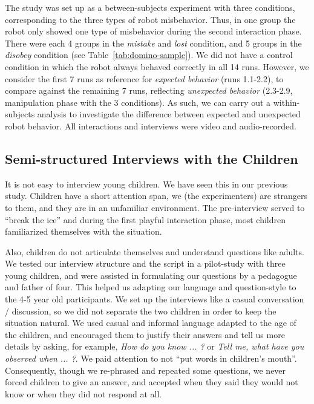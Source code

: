 \documentclass{sig-alternate}
\begin{document}

The study was set up as a between-subjects experiment with three conditions,
corresponding to the three types of robot misbehavior. Thus, in one group the
robot only showed one type of misbehavior during the second interaction phase.
There were each 4 groups in the \textit{mistake} and \textit{lost} condition,
and 5 groups in the \textit{disobey} condition (see
Table~\ref{tab:domino-sample}). We did not have a control condition in which the
robot always behaved correctly in all 14 runs. However, we consider the first 7
runs as reference for \textit{expected behavior} (runs 1.1-2.2), to compare
against the remaining 7 runs, reflecting \textit{unexpected behavior} (2.3-2.9,
manipulation phase with the 3 conditions). As such, we can carry out a
within-subjects analysis to investigate the difference between expected and
unexpected robot behavior. All interactions and interviews were video and
audio-recorded.

\subsection{Semi-structured Interviews with the Children}	

It is not easy to interview young children. We have seen this in our previous
study. Children have a short attention span, we (the experimenters) are
strangers to them, and they are in an unfamiliar environment. The pre-interview
served to ``break the ice'' and during the first playful interaction phase, most
children familiarized themselves with the situation.

Also, children do not articulate themselves and understand questions like
adults. We tested our interview structure and the script in a pilot-study with
three young children, and were assisted in formulating our questions by a
pedagogue and father of four. This helped us adapting our language and
question-style to the 4-5 year old participants. We set up the interviews like a
casual conversation / discussion, so we did not separate the two children in
order to keep the situation natural. We used casual and informal language
adapted to the age of the children, and encouraged them to justify their answers
and tell us more details by asking, for example, \textit{How do you know ... ?}
or \textit{Tell me, what have you observed when ... ?}. We paid attention to not
``put words in children's mouth''. Consequently, though we re-phrased and
repeated some questions, we never forced children to give an answer, and
accepted when they said they would not know or when they did not respond at all.	
\end{document}
